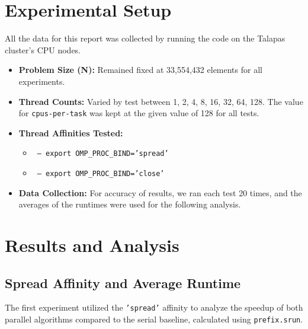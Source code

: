 \documentclass[11pt, letterpaper]{article}
\begin{document}
\section{Experimental Setup}
All the data for this report was collected by running the code on the Talapas cluster's CPU nodes.

\begin{itemize}
    \item \textbf{Problem Size (N):} Remained fixed at 33,554,432 elements for all experiments.

    \item \textbf{Thread Counts:} Varied by test between {1, 2, 4, 8, 16, 32, 64, 128}. The value for \texttt{cpus-per-task} was kept at the given value of 128 for all tests.

    \item \textbf{Thread Affinities Tested:}
    \begin{itemize}
        \item \texttt{ -- export OMP\_PROC\_BIND='spread'}
        \item \texttt{ -- export OMP\_PROC\_BIND='close'}
    \end{itemize}

    \item \textbf{Data Collection:} For accuracy of results, we ran each test 20 times, and the averages of the runtimes were used for the following analysis. 
\end{itemize}

\section{Results and Analysis}
\subsection{Spread Affinity and Average Runtime}
The first experiment utilized the \texttt{'spread'} affinity to analyze the speedup of both parallel algorithms compared to the serial baseline, calculated using \texttt{prefix.srun}.
\end{document}
